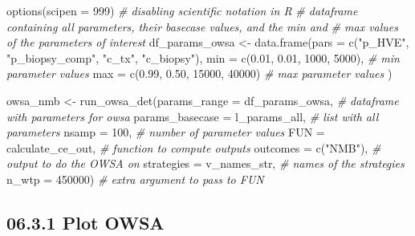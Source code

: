 \documentclass[
]{article}
\newenvironment{Shaded}{\begin{snugshade}}{\end{snugshade}}
\newcommand{\AttributeTok}[1]{\textcolor[rgb]{0.77,0.63,0.00}{#1}}
\newcommand{\CommentTok}[1]{\textcolor[rgb]{0.56,0.35,0.01}{\textit{#1}}}
\newcommand{\DecValTok}[1]{\textcolor[rgb]{0.00,0.00,0.81}{#1}}
\newcommand{\FloatTok}[1]{\textcolor[rgb]{0.00,0.00,0.81}{#1}}
\newcommand{\FunctionTok}[1]{\textcolor[rgb]{0.00,0.00,0.00}{#1}}
\newcommand{\NormalTok}[1]{#1}
\newcommand{\OtherTok}[1]{\textcolor[rgb]{0.56,0.35,0.01}{#1}}
\newcommand{\StringTok}[1]{\textcolor[rgb]{0.31,0.60,0.02}{#1}}
\begin{document}
\begin{Shaded}
\begin{Highlighting}[]
\FunctionTok{options}\NormalTok{(}\AttributeTok{scipen =} \DecValTok{999}\NormalTok{) }\CommentTok{\# disabling scientific notation in R}
\CommentTok{\# dataframe containing all parameters, their basecase values, and the min and }
\CommentTok{\# max values of the parameters of interest }
\NormalTok{df\_params\_owsa }\OtherTok{\textless{}{-}} \FunctionTok{data.frame}\NormalTok{(}\AttributeTok{pars =} \FunctionTok{c}\NormalTok{(}\StringTok{"p\_HVE"}\NormalTok{, }\StringTok{"p\_biopsy\_comp"}\NormalTok{, }\StringTok{"c\_tx"}\NormalTok{, }\StringTok{"c\_biopsy"}\NormalTok{),}
                             \AttributeTok{min  =} \FunctionTok{c}\NormalTok{(}\FloatTok{0.01}\NormalTok{, }\FloatTok{0.01}\NormalTok{,  }\DecValTok{1000}\NormalTok{, }\DecValTok{5000}\NormalTok{),  }\CommentTok{\# min parameter values}
                             \AttributeTok{max  =} \FunctionTok{c}\NormalTok{(}\FloatTok{0.99}\NormalTok{, }\FloatTok{0.50}\NormalTok{, }\DecValTok{15000}\NormalTok{, }\DecValTok{40000}\NormalTok{)  }\CommentTok{\# max parameter values}
\NormalTok{                             )}

\NormalTok{owsa\_nmb }\OtherTok{\textless{}{-}} \FunctionTok{run\_owsa\_det}\NormalTok{(}\AttributeTok{params\_range =}\NormalTok{ df\_params\_owsa,  }\CommentTok{\# dataframe with parameters for owsa}
                         \AttributeTok{params\_basecase =}\NormalTok{ l\_params\_all, }\CommentTok{\# list with all parameters}
                         \AttributeTok{nsamp      =} \DecValTok{100}\NormalTok{,               }\CommentTok{\# number of parameter values}
                         \AttributeTok{FUN        =}\NormalTok{ calculate\_ce\_out,  }\CommentTok{\# function to compute outputs}
                         \AttributeTok{outcomes   =} \FunctionTok{c}\NormalTok{(}\StringTok{"NMB"}\NormalTok{),          }\CommentTok{\# output to do the OWSA on}
                         \AttributeTok{strategies =}\NormalTok{ v\_names\_str,       }\CommentTok{\# names of the strategies}
                         \AttributeTok{n\_wtp      =} \DecValTok{450000}\NormalTok{)            }\CommentTok{\# extra argument to pass to FUN}
\end{Highlighting}
\end{Shaded}

\hypertarget{plot-owsa}{%
\subsection{06.3.1 Plot OWSA}\label{plot-owsa}}
\end{document}
